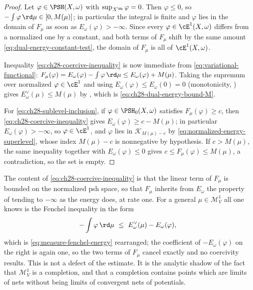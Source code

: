 \begin{proof}
Let $\varphi\in\PSH(X,\omega)$ with $\sup_{X^{\An}}\varphi=0$.  Then
$\varphi\leq0$, so $-\int\varphi\,\rd\mu\in[0,M(\mu)]$; in particular
the integral is finite and $\varphi$ lies in the domain of $F_\mu$ as
soon as $E_\omega(\varphi)>-\infty$.  Since every
$\varphi\in\cE^1(X,\omega)$ differs from a normalized one by a constant,
and both terms of $F_\mu$ shift by the same amount
\eqref{eq:dual-energy-constant-test}, the domain of $F_\mu$ is all of
$\cE^1(X,\omega)$.

Inequality \eqref{eq:ch28-coercive-inequality} is now immediate from
\eqref{eq:variational-functional}:
$F_\mu(\varphi)=E_\omega(\varphi)-\int\varphi\,\rd\mu\leq
E_\omega(\varphi)+M(\mu)$.  Taking the supremum over normalized
$\varphi\in\cE^1$ and using $E_\omega(\varphi)\leq E_\omega(0)=0$
(monotonicity, ) gives
$E^\vee_\omega(\mu)\leq M(\mu)$ by
, which is
\eqref{eq:ch28-dual-energy-bound-M}.

For \eqref{eq:ch28-sublevel-inclusion}, if $\varphi\in\PSH_0(X,\omega)$
satisfies $F_\mu(\varphi)\geq c$, then
\eqref{eq:ch28-coercive-inequality} gives
$E_\omega(\varphi)\geq c-M(\mu)$; in particular
$E_\omega(\varphi)>-\infty$, so $\varphi\in\cE^1$, and $\varphi$ lies
in $\mathcal K_{M(\mu)-c}$ by \eqref{eq:normalized-energy-superlevel},
whose index $M(\mu)-c$ is nonnegative by hypothesis.  If $c>M(\mu)$, the
same inequality together with $E_\omega(\varphi)\leq0$ gives
$c\leq F_\mu(\varphi)\leq M(\mu)$, a contradiction, so the set is empty.
\end{proof}

\begin{remark}
\label{rem:ch28-coercivity-shape}
The content of \eqref{eq:ch28-coercive-inequality} is that the linear term
of $F_\mu$ is bounded on the normalized psh space, so that $F_\mu$
inherits from $E_\omega$ the property of tending to $-\infty$ as the
energy does, at rate one.  For a general $\mu\in\mathcal M^1_V$ all one
knows is the Fenchel inequality in the form
\[
 -\int\varphi\,\rd\mu\ \leq\ E^\vee_\omega(\mu)-E_\omega(\varphi),
\]
which is \eqref{eq:measure-fenchel-energy} rearranged; the coefficient of
$-E_\omega(\varphi)$ on the right is again one, so the two terms of
$F_\mu$ cancel exactly and no coercivity results.  This is not a defect of
the estimate.  It is the analytic shadow of the fact that
$\mathcal M^1_V$ is a completion, and that a completion contains points
which are limits of nets without being limits of convergent nets of
potentials.
\end{remark}

